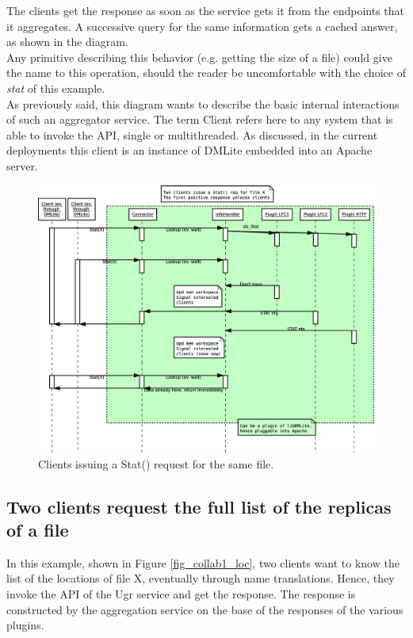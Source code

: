 \documentclass[12pt]{article} %
\begin{document}
The clients get the response as soon as the service gets it from the endpoints that it aggregates.
A successive query for the same information gets a cached answer, as shown in the diagram.\\

Any primitive describing this behavior (e.g. getting the size of a file) could give the name to this operation, should the reader be uncomfortable with the choice of \textit{stat} of this example.\\

As previously said, this diagram wants to describe the basic internal interactions of such an aggregator service. The term Client refers here to any system that is able to invoke the API, single or multithreaded. As discussed, in the current deployments this client is an instance of DMLite embedded into an Apache server.

\begin{figure}
\begin{center}
\includegraphics[width=28pc]{collab1.eps}
\end{center}
\caption{\label{fig_collab1}Clients issuing a Stat() request for the same file.}
\end{figure}

\subsection{Two clients request the full list of the replicas of a file}

In this example, shown in Figure \ref{fig_collab1_loc}, two clients want to know the list of the locations of file X, eventually through name translations. Hence, they invoke the API of the Ugr service and get the response. The response is constructed by the aggregation service on the base of the responses of the various plugins.\\
\end{document}
